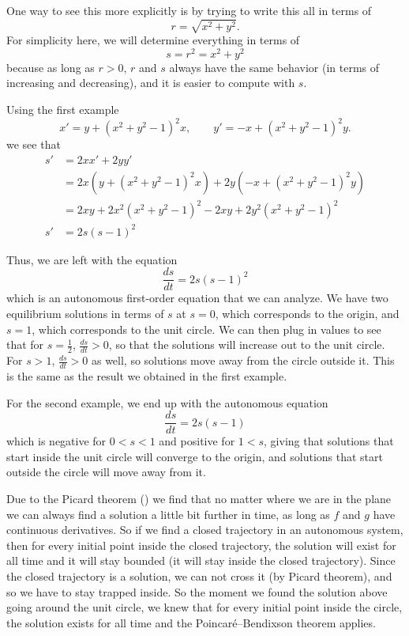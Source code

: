 One way to see this more explicitly is by trying to write this all in terms of 
\[ r = \sqrt{x^2 + y^2}. \] For simplicity here, we will determine everything in terms of \[ s = r^2 = x^2 + y^2 \] because as long as $r > 0$, $r$ and $s$ always have the same behavior (in terms of increasing and decreasing), and it is easier to compute with $s$. 

Using the first example
\begin{equation*}
x' = y + {(x^2+y^2-1)}^2 x, \qquad
y' = -x + {(x^2+y^2-1)}^2 y.
\end{equation*}
we see that
\[ \begin{split}
 s' &= 2xx' + 2yy' \\
 &= 2x(y + {(x^2+y^2-1)}^2 x) + 2y(-x + {(x^2+y^2-1)}^2 y) \\
 &= 2xy + 2x^2(x^2 + y^2 - 1)^2 - 2xy + 2y^2(x^2 + y^2 - 1)^2 \\
s' &= 2s(s-1)^2
\end{split}
\]

Thus, we are left with the equation
\[ \frac{ds}{dt} = 2s(s-1)^2 \]
which is an autonomous first-order equation that we can analyze. We have two equilibrium solutions in terms of $s$ at $s=0$, which corresponds to the origin, and $s=1$, which corresponds to the unit circle. We can then plug in values to see that for $s = \frac{1}{2}$, $\frac{ds}{dt} > 0$, so that the solutions will increase out to the unit circle. For $s>1$, $\frac{ds}{dt} > 0$ as well, so solutions move away from the circle outside it. This is the same as the result we obtained in the first example.

For the second example, we end up with the autonomous equation
\[ \frac{ds}{dt} = 2s(s-1) \] which is negative for $0 < s < 1$ and positive for $1 < s$, giving that solutions that start inside the unit circle will converge to the origin, and solutions that start outside the circle will move away from it.

Due to the Picard theorem () we find that no matter
where we are in the plane we can always find a solution a little bit
further in time,
as long as $f$ and $g$ have continuous derivatives.  So 
if we find a closed trajectory in an autonomous system,
then for every initial point inside
the closed trajectory, the solution will exist for all time and it will stay
bounded (it will stay inside the closed trajectory). Since the closed trajectory is a solution, we can not cross it (by Picard theorem), and so we have to stay trapped inside. So the moment
we found the solution above going around the unit circle, we knew that for
every initial point inside the circle, the solution exists for all time and
the Poincar\'e--Bendixson theorem applies.

